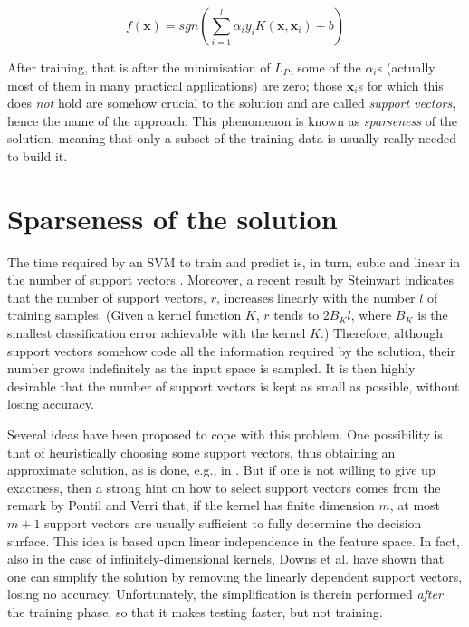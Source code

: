 \documentclass[10pt,twocolumn,letterpaper]{article}
\def\xx{\mathbf{x}}
\begin{document}
\begin{equation} \label{eqn:sol}
  f(\xx) = sgn \left( \sum_{i=1}^l \alpha_i y_i K(\xx,\xx_i) + b \right)
\end{equation}

After training, that is after the minimisation of $L_P$, some of the
$\alpha_i$s (actually most of them in many practical applications) are
zero; those $\xx_i$s for which this does \emph{not} hold are somehow
crucial to the solution and are called \emph{support vectors}, hence
the name of the approach. This phenomenon is known as
\emph{sparseness} of the solution, meaning that only a subset of the
training data is usually really needed to build it.

\section{Sparseness of the solution}
\label{sec:spars}

The time required by an SVM to train and predict is, in turn, cubic
and linear in the number of support vectors
\cite{KeerthiCDC06}. Moreover, a recent result by Steinwart
\cite{Steinwart03} indicates that the number of support vectors, $r$,
increases linearly with the number $l$ of training samples. (Given a
kernel function $K$, $r$ tends to $2 B_K l$, where $B_K$ is the
smallest classification error achievable with the kernel $K$.)
Therefore, although support vectors somehow code all the information
required by the solution, their number grows indefinitely as the input
space is sampled. It is then highly desirable that the number of
support vectors is kept as small as possible, without losing accuracy.

Several ideas have been proposed to cope with this problem. One
possibility is that of heuristically choosing some support vectors,
thus obtaining an approximate solution, as is done, e.g., in
\cite{KeerthiCDC06,LeeM01,schoel06}. But if one is not willing to give
up exactness, then a strong hint on how to select support vectors
comes from the remark by Pontil and Verri \cite{PontilV98} that, if
the kernel has finite dimension $m$, at most $m + 1$ support vectors
are usually sufficient to fully determine the decision surface. This
idea is based upon linear independence in the feature space. In fact,
also in the case of infinitely-dimensional kernels, Downs et
al. \cite{DownsGM01} have shown that one can simplify the solution by
removing the linearly dependent support vectors, losing no
accuracy. Unfortunately, the simplification is therein performed
\emph{after} the training phase, so that it makes testing faster, but
not training.
\end{document}
